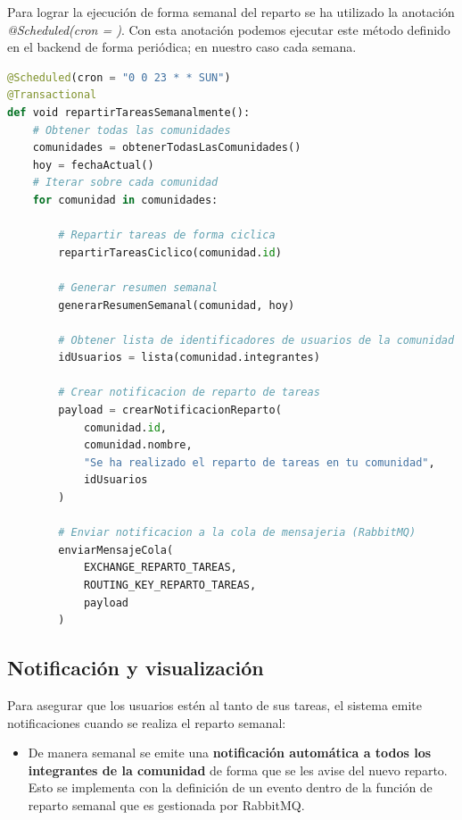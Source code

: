\vspace{0.25em}
Para lograr la ejecución de forma semanal del reparto se ha utilizado la anotación \textit{@Scheduled(cron = )}. Con esta anotación podemos ejecutar este método definido en el backend de forma periódica; en nuestro caso cada semana.
\begin{lstlisting}[language=Python, caption={Pseudocódigo de la función repartirTareasSemanalmente}]
@Scheduled(cron = "0 0 23 * * SUN")
@Transactional
def void repartirTareasSemanalmente():
    # Obtener todas las comunidades
    comunidades = obtenerTodasLasComunidades()
    hoy = fechaActual()
    # Iterar sobre cada comunidad
    for comunidad in comunidades:
        
        # Repartir tareas de forma ciclica
        repartirTareasCiclico(comunidad.id)
        
        # Generar resumen semanal
        generarResumenSemanal(comunidad, hoy)

        # Obtener lista de identificadores de usuarios de la comunidad
        idUsuarios = lista(comunidad.integrantes)

        # Crear notificacion de reparto de tareas
        payload = crearNotificacionReparto(
            comunidad.id,
            comunidad.nombre,
            "Se ha realizado el reparto de tareas en tu comunidad",
            idUsuarios
        )

        # Enviar notificacion a la cola de mensajeria (RabbitMQ)
        enviarMensajeCola(
            EXCHANGE_REPARTO_TAREAS,
            ROUTING_KEY_REPARTO_TAREAS,
            payload
        )

\end{lstlisting}


\subsection*{Notificación y visualización}

Para asegurar que los usuarios estén al tanto de sus tareas, el sistema emite notificaciones cuando se realiza el reparto semanal:

\begin{itemize}
    \item De manera semanal se emite una \textbf{notificación automática a todos los integrantes de la comunidad} de forma que se les avise del nuevo reparto. Esto se implementa con la definición de un evento dentro de la función de reparto semanal que es gestionada por RabbitMQ. 
\end{itemize}


